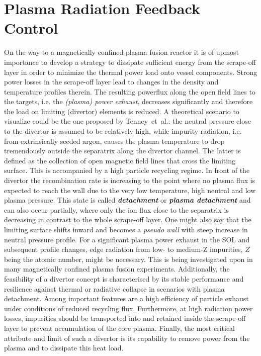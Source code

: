 %
\chapter{Plasma Radiation Feedback Control}\label{chap:realtimefeedback}%
%
    On the way to a magnetically confined plasma fusion reactor it is of upmost importance to develop a strategy to dissipate sufficient energy from the scrape-off layer in order to minimize the thermal power load onto vessel components\cite{Feng2016,Feng2005,Kallenbach2013,Pacher2007,Schmitz2020}. Strong power losses in the scrape-off layer lead to changes in the density and temperature profiles therein. The resulting powerflux along the open field lines to the targets, i.e. the \textit{(plasma) power exhaust}, decreases significantly and therefore the load on limiting (divertor) elements is reduced\cite{Kallenbach2013}. A theoretical scenario to visualize could be the one proposed by Tenney~et~al.\cite{Tenney1974}: the neutral pressure close to the divertor is assumed to be relatively high, while impurity radiation, i.e. from extrinsically seeded argon, causes the plasma temperature to drop tremendously outside the separatrix along the divertor channel. The latter is defined as the collection of open magnetic field lines that cross the limiting surface. This is accompanied by a high particle recycling regime\cite{Marmar1978,Stangeby1990}. In front of the divertor the recombination rate is increasing to the point where no plasma flux is expected to reach the wall due to the very low temperature, high neutral and low plasma pressure. This state is called \textbf{\textit{detachment}} or \textbf{\textit{plasma detachment}} and can also occur partially, where only the ion flux close to the separatrix is decreasing in contrast to the whole scrape-off layer\cite{Loarte1998}. One might also say that the limiting surface shifts inward and becomes a \textit{pseudo wall} with steep increase in neutral pressure profile. For a significant plasma power exhaust in the SOL and subsequent profile changes, edge radiation from low- to medium-Z impurities, $Z$ being the atomic number, might be necessary. This is being investigated upon in many magnetically confined plasma fusion experiments\cite{Pacher2007,Kallenbach2013}. Additionally, the feasibility of a divertor concept is characterised by its stable performance and resilience against thermal or radiative collapse in scenarios with plasma detachment. Among important features are a high efficiency of particle exhaust under conditions of reduced recycling flux. Furthermore, at high radiation power losses, impurities should be transported into and retained inside the scrape-off layer to prevent accumulation of the core plasma. Finally, the most critical attribute and limit of such a divertor is its capability to remove power from the plasma and to dissipate this heat load.\\%

